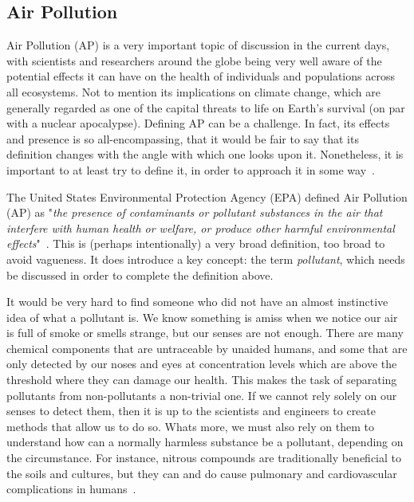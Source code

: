 \subsection{Air Pollution}%
\label{ssub:air_pollution}

Air Pollution (\gls{AP}) is a very important topic of discussion in the
current days, with scientists and researchers around the globe being
very well aware of the potential effects it can have on the health of
individuals and populations across all ecosystems. Not to mention its
implications on climate change, which are generally regarded as one of
the capital threats to life on Earth's survival (on par with a nuclear
apocalypse). Defining \gls{AP} can be a challenge. In fact, its effects
and presence is so all-encompassing, that it would be fair to say that
its definition changes with the angle with which one looks upon it.
Nonetheless, it is important to at least try to define it, in order to
approach it in some way~\cite{Lovett2009, Ghorani-Azam2016}.

The United States Environmental Protection Agency (\Gls{EPA}) defined
Air Pollution (\Gls{AP}) as "\textit{the presence of contaminants or
    pollutant substances in the air that interfere with human health or
    welfare, or produce other harmful environmental
effects}"~\cite{Vallero2014}. This is (perhaps intentionally) a very
broad definition, too broad to avoid vagueness. It does introduce a key
concept: the term \emph{pollutant}, which needs be discussed in order
to complete the definition above.

It would be very hard to find someone who did not have an almost
instinctive idea of what a pollutant is. We know something is amiss when
we notice our air is full of smoke or smells strange, but our senses are
not enough. There are many chemical components that are untraceable by
unaided humans, and some that are only detected by our noses and eyes at
concentration levels which are above the threshold where they can damage
our health. This makes the task of separating pollutants from
non-pollutants a non-trivial one. If we cannot rely solely on our senses
to detect them, then it is up to the scientists and engineers to create
methods that allow us to do so. Whats more, we must also rely on them to
understand how can a normally harmless substance be a pollutant,
depending on the circumstance. For instance, nitrous compounds are
traditionally beneficial to the soils and cultures, but they can and do
cause pulmonary and  cardiovascular complications in
humans~\cite{Kampa2008, Ghorani-Azam2016, Carugno2016}.

